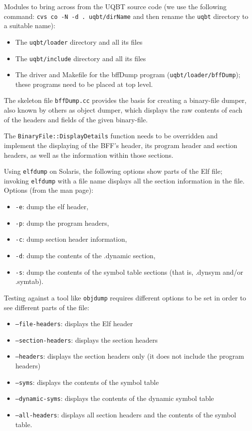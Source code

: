 Modules to bring across from the UQBT source code (we use the
following command: \texttt{cvs co -N -d . uqbt/dirName} 
and then rename the \texttt{uqbt} directory to a suitable 
name): 
\begin{itemize}
\item The \texttt{uqbt/loader} directory and all its files
\item The \texttt{uqbt/include} directory and all its files
\item The driver and Makefile for the bffDump program 
	(\texttt{uqbt/loader/bffDump}); these programs 
	need to be placed at top level. 
\end{itemize}

The skeleton file \texttt{bffDump.cc} provides the basis 
for creating a binary-file dumper, also known by others as object 
dumper, which displays the raw contents of each of the headers and 
fields of the given binary-file.

The \texttt{BinaryFile::DisplayDetails} function needs to be overridden 
and implement the displaying of the BFF's header, its program 
header and section headers, as well as the information within 
those sections. 

Using \texttt{elfdump} on Solaris, the following options 
show parts of the Elf file; invoking \texttt{elfdump} with 
a file name displays all the section information in the file. 
Options (from the man page): 
\begin{itemize}
\item \texttt{-e}: dump the elf header,
\item \texttt{-p}: dump the program headers, 
\item \texttt{-c}: dump section header information,
\item \texttt{-d}: dump the contents of the .dynamic section,
\item \texttt{-s}: dump the contents of the symbol table sections (that
           is, .dynsym and/or .symtab).
\end{itemize}

Testing against a tool like \texttt{objdump} requires different
options to be set in order to see different parts of the file: 
\begin{itemize}
\item \texttt{--file-headers}: displays the Elf header
\item \texttt{--section-headers}: displays the section headers 
\item \texttt{--headers}: displays the section headers only (it 
	does not include the program headers)
\item \texttt{--syms}: displays the contents of the symbol table
\item \texttt{--dynamic-syms}: displays the contents of the dynamic symbol 
	table
\item \texttt{--all-headers}: displays all section headers and the 
	contents of the symbol table.
\end{itemize}



